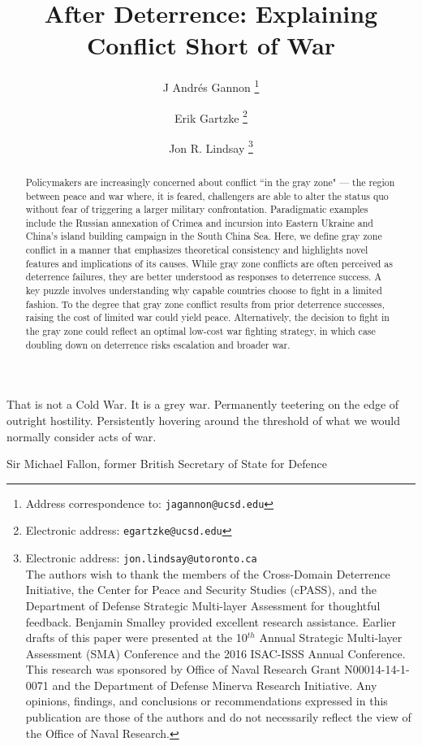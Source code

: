 \documentclass[12pt,letterpaper]{article}
\title{After Deterrence: Explaining Conflict Short of War}
\author{J Andr\'{e}s Gannon%
	\thanks{Address correspondence to: \texttt{jagannon@ucsd.edu}}}
\affil{Department of Political Science \\ University of California, San Diego}
\author{Erik Gartzke%
	\thanks{Electronic address: \texttt{egartzke@ucsd.edu}}}
\affil{Department of Political Science\\ Director, Center for Peace and Security Studies (cPASS)\\ University of California, San Diego}
\author{Jon R. Lindsay%
	\thanks{Electronic address: \texttt{jon.lindsay@utoronto.ca} \\ The authors wish to thank the members of the Cross-Domain Deterrence Initiative, the Center for Peace and Security Studies (cPASS), and the Department of Defense Strategic Multi-layer Assessment for thoughtful feedback. Benjamin Smalley provided excellent research assistance. Earlier drafts of this paper were presented at the 10$^{th}$ Annual Strategic Multi-layer Assessment (SMA) Conference and the 2016 ISAC-ISSS Annual Conference. This research was sponsored by Office of Naval Research Grant N00014-14-1-0071 and the Department of Defense Minerva Research Initiative. Any opinions, findings, and conclusions or recommendations expressed in this publication are those of the authors and do not necessarily reflect the view of the Office of Naval Research.}}
\affil{Munk School of Global Affairs\\ University of Toronto}
\begin{document}
\maketitle

\begin{abstract}
	\noindent Policymakers are increasingly concerned about conflict ``in the gray zone" --- the region between peace and war where, it is feared, challengers are able to alter the status quo without fear of triggering a larger military confrontation. Paradigmatic examples include the Russian annexation of Crimea and incursion into Eastern Ukraine and China's island building campaign in the South China Sea. Here, we define gray zone conflict in a manner that emphasizes theoretical consistency and highlights novel features and implications of its causes. While gray zone conflicts are often perceived as deterrence failures, they are better understood as responses to deterrence success. A key puzzle involves understanding why capable countries choose to fight in a limited fashion. To the degree that gray zone conflict results from prior deterrence successes, raising the cost of limited war could yield peace. Alternatively, the decision to fight in the gray zone could reflect an optimal low-cost war fighting strategy, in which case doubling down on deterrence risks escalation and broader war.
\end{abstract}

\newpage

\setlength{\epigraphwidth}{4.5in}
\epigraph{That is not a Cold War. It is a grey war. Permanently teetering on the edge of outright hostility. Persistently hovering around the threshold of what we would normally consider acts of war.}{Sir Michael Fallon, former British Secretary of State for Defence}
\end{document}
